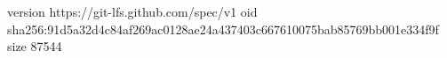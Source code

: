 version https://git-lfs.github.com/spec/v1
oid sha256:91d5a32d4c84af269ac0128ae24a437403c667610075bab85769bb001e334f9f
size 87544
